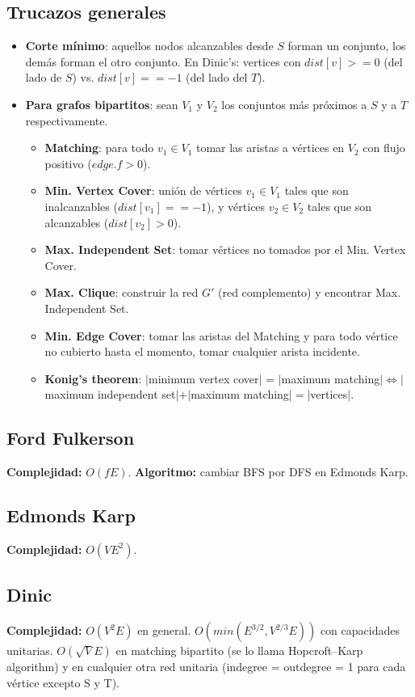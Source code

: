 {\subsection{Trucazos generales}
\begin{itemize}
\item \textbf{Corte mínimo}: aquellos nodos alcanzables desde $S$ forman un conjunto, los demás forman el otro conjunto.
En Dinic's: vertices con $dist[v] >= 0$ (del lado de $S$) vs.  $dist[v] == -1$ (del lado del $T$).
\item \textbf{Para grafos bipartitos}: sean $V_1$ y $V_2$ los conjuntos más próximos a $S$ y a $T$ respectivamente.
	\begin{itemize}
	\item \textbf{Matching}: para todo $v_1 \in V_1$ tomar las aristas a vértices en $V_2$ con flujo positivo ($edge.f > 0$).
	\item \textbf{Min. Vertex Cover}: unión de vértices $v_1 \in V_1$ tales que son inalcanzables ($dist[v_1] == -1$),
	y vértices $v_2 \in V_2$ tales que son alcanzables ($dist[v_2] > 0$).
	\item \textbf{Max. Independent Set}: tomar vértices no tomados por el Min. Vertex Cover.
	\item \textbf{Max. Clique}: construir la red $G'$ (red complemento) y encontrar Max. Independent Set.
	\item \textbf{Min. Edge Cover}: tomar las aristas del Matching y para todo vértice no cubierto hasta el momento, 
	tomar cualquier arista incidente.
    \item \textbf{Konig's theorem}: $|$minimum vertex cover$|$ = $|$maximum matching$| \Leftrightarrow |$maximum independent set$| + |$maximum matching$| = |$vertices$|$.\\
	\end{itemize}
\end{itemize}

\subsection{Ford Fulkerson}
\textbf{Complejidad: } $O(fE)$.
\textbf{Algoritmo: } cambiar BFS por DFS en Edmonds Karp.

\subsection{Edmonds Karp}
\textbf{Complejidad: } $O(VE^2)$.

\subsection{Dinic}
\textbf{Complejidad: } $O(V^2E)$ en general. $O(min(E^{3/2}, V^{2/3}E))$ con capacidades unitarias. $O(\sqrt{V}E)$ en matching bipartito (se lo llama Hopcroft–Karp algorithm) y en cualquier otra red unitaria (indegree = outdegree = 1 para cada vértice excepto S y T). 

}
